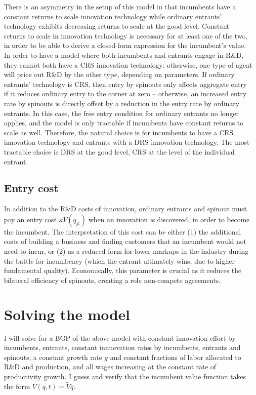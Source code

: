 \documentclass[12pt,english]{article}
\theoremstyle{remark}
\begin{document}
There is an asymmetry in the setup of this model in that incumbents have a constant returns to scale innovation technology while ordinary entrants' technology exhibits decreasing returns to scale at the good level.  Constant returns to scale in innovation technology is necessary for at least one of the two, in order to be able to derive a closed-form expression for the incumbent's value. In order to have a model where both incumbents and entrants engage in R\&D, they cannot both have a CRS innovation technology: otherwise, one type of agent will price out R\&D by the other type, depending on parameters. If ordinary entrants' technology is CRS, then entry by spinouts only affects aggregate entry if it reduces ordinary entry to the corner at zero -- otherwise, an increased entry rate by spinouts is directly offset by a reduction in the entry rate by ordinary entrants. In this case, the free entry condition for ordinary entrants no longer applies, and the model is only tractable if incumbents have constant returns to scale as well. Therefore, the natural choice is for incumbents to have a CRS innovation technology and entrants with a DRS innovation technology. The most tractable choice is DRS at the good level, CRS at the level of the individual entrant.


\subsection{Entry cost}

In addition to the R\&D costs of innovation, ordinary entrants and spinout must pay an entry cost $\kappa V(q_{jt})$ when an innovation is discovered, in order to become the incumbent. The interpretation of this cost can be either (1) the additional costs of building a business and finding customers that an incumbent would not need to incur, or (2) as a reduced form for lower markups in the industry during the battle for incumbency (which the entrant ultimately wins, due to higher fundamental quality). Economically, this parameter is crucial as it reduces the bilateral efficiency of spinouts, creating a role non-compete agreements. 


\section{Solving the model}

I will solve for a BGP of the above model with constant innovation effort by incumbents, entrants, constant innnovation rates by incumbents, entrants and spinouts; a constant growth rate $g$ and constant fractions of labor allocated to R\&D and production, and all wages increasing at the constant rate of productivity growth. I guess and verify that the incumbent value function takes the form $V(q,t) = \tilde{V}q$. 
\end{document}
